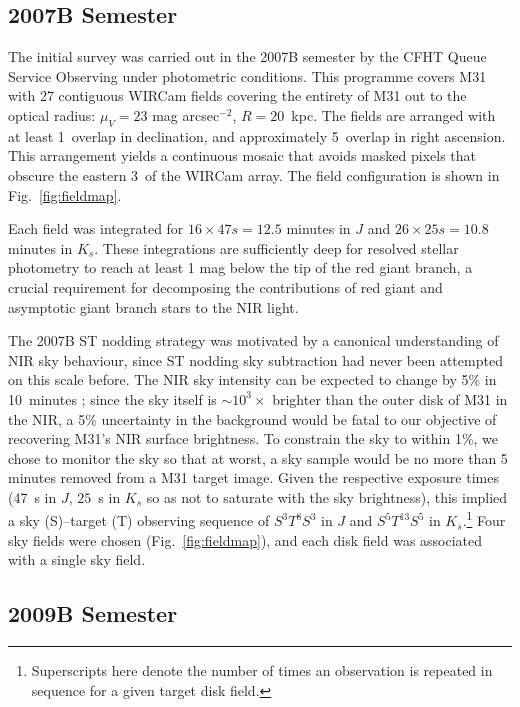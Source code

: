 \documentclass[iop]{emulateapj}
\newcommand{\Fig}[1]{Fig.~\ref{fig:#1}}  %
\begin{document}
\subsection{2007B Semester}
\label{sec:obs7}

The initial survey was carried out in the 2007B semester by the CFHT Queue Service Observing under photometric conditions. This programme covers M31 with 27 contiguous WIRCam fields covering the entirety of M31 out to the optical radius: $\mu_V=23$ mag arcsec$^{-2}$, $R=20$~kpc. The fields are arranged with at least 1\arcmin\ overlap in declination, and approximately 5\arcmin\ overlap in right ascension.
This arrangement yields a continuous mosaic that avoids masked pixels that obscure the eastern 3\arcmin\ of the WIRCam array. The field configuration is shown in \Fig{fieldmap}.

Each field was integrated for $16\times 47 s = 12.5$ minutes in $J$ and $26\times 25 s = 10.8$ minutes in $K_s$. These integrations are sufficiently deep for resolved stellar photometry to reach at least 1 mag below the tip of the red giant branch, a crucial requirement for decomposing the contributions of red giant and asymptotic giant branch stars to the NIR light.

The 2007B ST nodding strategy was motivated by a canonical understanding of NIR sky behaviour, since ST nodding sky subtraction had never been attempted on this scale before.
The NIR sky intensity can be expected to change by 5\% in 10~minutes \citep{Adams:1996,Vaduvescu:2004}; since the sky itself is $\sim10^3\times$ brighter than the outer disk of M31 in the NIR, a 5\% uncertainty in the background would be fatal to our objective of recovering M31's NIR surface brightness.
To constrain the sky to within 1\%, we chose to monitor the sky so that at worst, a sky sample would be no more than 5 minutes removed from a M31 target image.
Given the respective exposure times (47~s in $J$, $25$~s in $K_s$ so as not to saturate with the sky brightness), this implied a sky (S)--target (T) observing sequence of $S^3T^8S^3$ in $J$ and $S^5T^{13}S^5$ in $K_s$.\footnote{Superscripts here denote the number of times an observation is repeated in sequence for a given target disk field.}
Four sky fields were chosen (\Fig{fieldmap}), and each disk field was associated with a single sky field.

\subsection{2009B Semester}
\label{sub:obs9}
\end{document}
